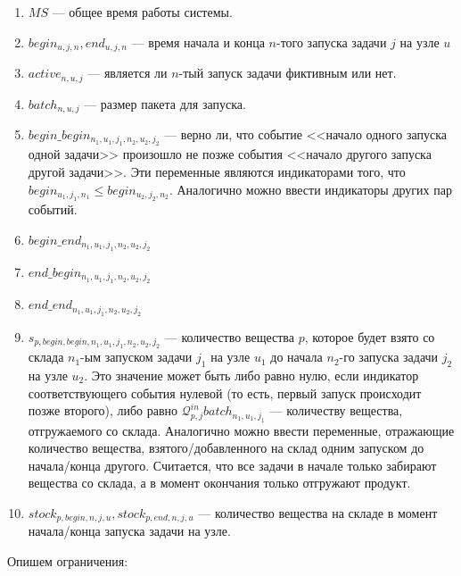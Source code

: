 \documentclass[12pt, twoside]{article}
\theoremstyle{definition}
\begin{document}
\begin{enumerate}

\item $MS$ --- общее время работы системы.
\item $begin_{u, j, n}, end_{u, j, n}$ --- время начала и конца $n$-того запуска задачи $j$ на узле $u$
\item $active_{n, u, j}$ --- является ли $n$-тый запуск задачи фиктивным или нет.
\item $batch_{n, u, j}$ --- размер пакета для запуска.
\item $begin\_begin_{n_1, u_1, j_1, n_2, u_2, j_2}$ --- верно ли, что событие <<начало одного запуска одной задачи>> произошло не позже события <<начало другого запуска другой задачи>>. Эти переменные являются индикаторами того, что $begin_{u_1, j_1, n_1} \leq begin_{u_2, j_2, n_2}$. Аналогично можно ввести индикаторы других пар событий.
\item $begin\_end_{n_1, u_1, j_1, n_2, u_2, j_2}$
\item $end\_begin_{n_1, u_1, j_1, n_2, u_2, j_2}$
\item $end\_end_{n_1, u_1, j_1, n_2, u_2, j_2}$
\item $s_{p, begin, begin, n_1, u_1, j_1, n_2, u_2, j_2}$ --- количество вещества $p$, которое будет взято со склада $n_1$-ым запуском задачи $j_1$ на узле $u_1$ до начала $n_2$-го запуска задачи $j_2$ на узле $u_2$. Это значение может быть либо равно нулю, если индикатор соответствующего события нулевой (то есть, первый запуск происходит позже второго), либо равно $\mathcal{Q}^{in}_{p, j} batch_{n_1, u_1, j_1}$ --- количеству вещества, отгружаемого со склада. Аналогично можно ввести переменные, отражающие количество вещества, взятого/добавленного на склад одним запуском до начала/конца другого. Считается, что все задачи в начале только забирают вещества со склада, а в момент окончания только отгружают продукт.
\item $stock_{p, begin, n, j, u}, stock_{p, end, n, j, u}$ --- количество вещества на складе в момент начала/конца запуска задачи на узле.

\end{enumerate}

Опишем ограничения:
\end{document}
